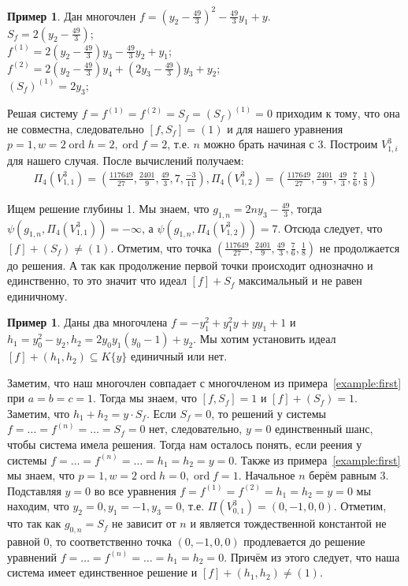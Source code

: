 \documentclass[16pt]{article}
\DeclareMathOperator{\ord}{ord}
\theoremstyle{plain1}
\theoremstyle{plain2}
\theoremstyle{plain}
\theoremstyle{plain3}
\theoremstyle{definition}
\newtheorem{example}[theorem3]{Пример}
\theoremstyle{remark}
\begin{document}
\begin{example}
Дан многочлен $f=(y_2-\frac{49}{3})^2-\frac{49}{3}y_1+y$.
\\
$S_f=2(y_2-\frac{49}{3})$;
\\
$f^{(1)}=2(y_2-\frac{49}{3})y_3-\frac{49}{3}y_2+y_1$;
\\
$f^{(2)}=2(y_2-\frac{49}{3})y_4+(2y_3-\frac{49}{3})y_3+y_2$;
\\
$(S_f)^{(1)}=2y_3$;

Решая систему $f=f^{(1)}=f^{(2)}=S_f=(S_f)^{(1)}=0$ приходим к тому,
что она не совместна, следовательно $[f,S_f]=(1)$ и  для нашего
уравнения $p=1,w=2\ord{h}=2,\ord{f}=2$, т.е. $n$  можно брать начиная с $3$. Построим ${V}_{1,i}^3$ для нашего случая. После вычислений получаем: 
\begin{gather*}
\Pi_{4}({V}_{1,1}^3)=\left(\frac{117649}{27},\frac{2401}{9},\frac{49}{3},7,\frac{-3}{11}\right),
\Pi_{4}({V}_{1,2}^3)=\left(\frac{117649}{27},\frac{2401}{9},\frac{49}{3},\frac{7}{6},\frac{1}{8}\right)
\end{gather*}

Ищем решение глубины 1. Мы знаем, что $g_{1,n}=2ny_3-\frac{49}{3}$, тогда $\psi(g_{1,n},\Pi_{4}({V}_{1,1}^3))=-\infty$, а $\psi(g_{1,n},\Pi_{4}({V}_{1,2}^3))=7$. Отсюда следует, что $[f]+(S_f)\not=(1)$. Отметим, что точка $\left(\frac{117649}{27},\frac{2401}{9},\frac{49}{3},\frac{7}{6},\frac{1}{8}\right)$ не продолжается до решения.  А так как продолжение первой точки происходит однозначно и единственно, то это значит что идеал $[f]+S_f$ максимальный и не равен единичному.


\end{example}



\begin{example}
Даны два многочлена $f= -y_1^2+y_1^2y+yy_1+1$ и $h_1=y_0^2-y_2,h_2=2y_0y_1(y_0-1)+y_2$. Мы хотим установить идеал $[f]+(h_1,h_2)\subseteq K\{y\}$ единичный или нет.

Заметим, что наш многочлен совпадает с многочленом из примера~\ref{example:first} при $a=b=c=1$. Тогда мы знаем, что $[f,S_f]=1$ и $[f]+(S_f)=1$. Заметим, что $h_1+h_2=y\cdot S_f$. Если $S_f=0$, то решений у системы $f=\ldots=f^{(n)}=\ldots=S_f=0$ нет, следовательно, $y=0$ единственный шанс, чтобы система имела решения. Тогда нам осталось понять, если реения у системы $f=\ldots=f^{(n)}=\ldots=h_1=h_2=y=0$. Также из примера~\ref{example:first} мы знаем, что $p=1,w=2\ord{h}=0,\ord{f}=1$. Начальное $n$ берём равным 3. Подставляя $y=0$ во все уравнения $f=f^{(1)}=f^{(2)}=h_1=h_2=y=0$  мы находим, что $y_2=0,y_1=- 1,y_3=0$, т.е. $\Pi(V^3_{0,1})=(0,-1,0,0)$. Отметим, что так как $g_{0,n}=S_f$  не зависит от $n$ и является тождественной константой не равной 0, то соответственно   точка $(0,-1,0,0)$  продлевается  до решение уравнений $f=\ldots=f^{(n)}=\ldots=h_1=h_2=0$. Причём  из этого следует, что наша система имеет единственное решение и $[f]+(h_1,h_2)\ne (1)$.

\end{example}
\end{document}
